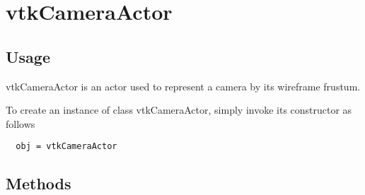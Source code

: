 \section{vtkCameraActor}

\subsection{Usage}

 vtkCameraActor is an actor used to represent a camera by its wireframe
 frustum.

To create an instance of class vtkCameraActor, simply
invoke its constructor as follows
\begin{verbatim}
  obj = vtkCameraActor
\end{verbatim}
\subsection{Methods}

